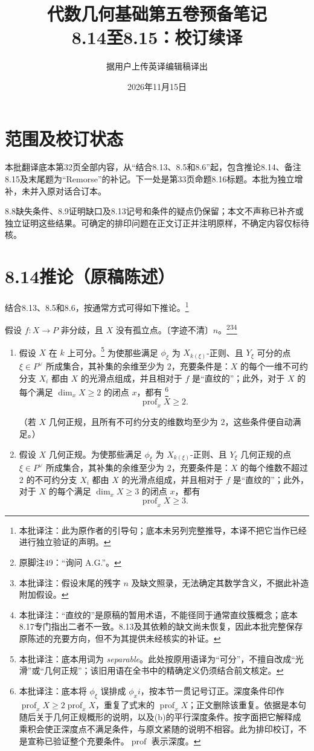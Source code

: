 \documentclass[openany]{ctexbook}
\title{代数几何基础第五卷预备笔记\\8.14至8.15：校订续译}
\author{据用户上传英译编辑稿译出}
\date{2026年11月15日}
\newcommand{\note}[1]{\footnote{本批译注：#1}}
\begin{document}
\maketitle
\chapter*{范围及校订状态}
本批翻译底本第32页全部内容，从“结合8.13、8.5和8.6”起，包含推论8.14、备注8.15及末尾题为“Remorse”的补记。下一处是第33页命题8.16标题。本批为独立增补，未并入原对话合订本。

8.8缺失条件、8.9证明缺口及8.13记号和条件的疑点仍保留；本文不声称已补齐或独立证明这些结果。可确定的排印问题在正文订正并注明原样，不确定内容仅标待核。
\chapter*{8.14\quad 推论（原稿陈述）}
结合8.13、8.5和8.6，按通常方式可得如下推论。\note{此为原作者的引导句；底本未另列完整推导，本译不把它当作已经进行独立验证的声明。}

假设 $f\colon X\to P$ 非分歧，且 $X$ 没有孤立点。〔字迹不清〕$n$。\footnote{原脚注49：“询问 A.G.”。}\note{假设末尾的残字 $n$ 及缺文照录，无法确定其数学含义，不据此补造附加假设。}\note{“直纹的”是原稿的暂用术语，不能径同于通常直纹簇概念；底本8.17专门指出二者不一致。8.13及其依赖的缺文尚未恢复，因此本批完整保存原陈述的充要方向，但不为其提供未经核实的补证。}
\begin{enumerate}
\item[(a)] 假设 $X$ 在 $k$ 上可分。\note{底本用词为 \emph{separable}。此处按原用语译为“可分”，不擅自改成“光滑”或“几何正规”；该旧用语在全书中的精确定义仍须结合前文核定。}
为使那些满足 $\phi_\xi$ 为 $X_{k(\xi)}$-正则、且 $Y_\xi$ 可分的点 $\xi\in P^\vee$ 所成集合，其补集的余维至少为 $2$，充要条件是：$X$ 的每个一维不可约分支 $X_i$ 都由 $X$ 的光滑点组成，并且相对于 $f$ 是“直纹的”；此外，对于 $X$ 的每个满足 $\dim_x X\ge2$ 的闭点 $x$，都有
\note{底本将 $\phi_\xi$ 误排成 $\phi_x i$，按本节一贯记号订正。深度条件印作 $\operatorname{prof}_x X\ge2\operatorname{prof}_x X$，重复了式末的 $\operatorname{prof}_x X$；正文删除该重复。依据是本句随后关于几何正规概形的说明，以及(b)的平行深度条件。按字面把它解释成乘积会使正深度点不满足条件，与原文紧随的说明不相容。此为排印校订，不是宣称已验证整个充要条件。$\operatorname{prof}$ 表示深度。}
\[
\operatorname{prof}_x X\ge2.
\]

（若 $X$ 几何正规，且所有不可约分支的维数均至少为 $2$，这些条件便自动满足。）
\item[(b)] 假设 $X$ 几何正规。为使那些满足 $\phi_\xi$ 为 $X_{k(\xi)}$-正则、且 $Y_\xi$ 几何正规的点 $\xi\in P^\vee$ 所成集合，其补集的余维至少为 $2$，充要条件是：$X$ 的每个维数不超过 $2$ 的不可约分支 $X_i$ 都由 $X$ 的光滑点组成，并且相对于 $f$ 是“直纹的”；此外，对于 $X$ 的每个满足 $\dim_x X\ge3$ 的闭点 $x$，都有
\[
\operatorname{prof}_x X\ge3.
\]
\end{enumerate}
\end{document}
